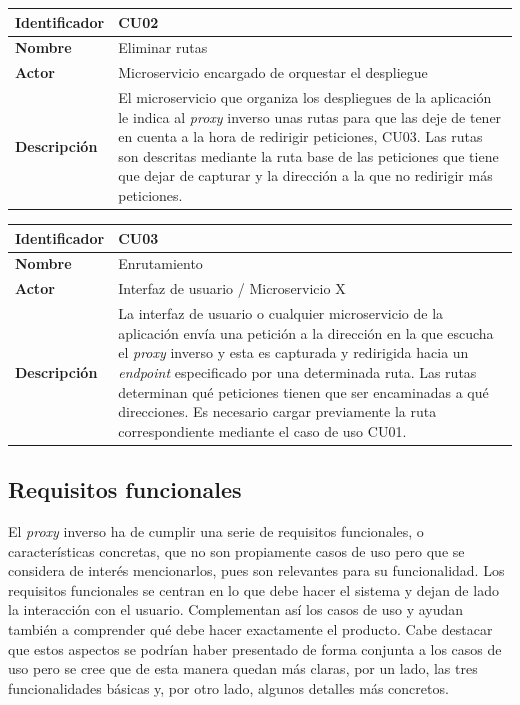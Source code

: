 \documentclass[11pt,spanish,listoffigures]{tfgetsinf}
\begin{document}
\begin{center} \begin{tabular}{| l | p{11.3cm} |}
\hline
\textbf{Identificador} & CU02
\\ \hline
\textbf{Nombre} & Eliminar rutas
\\ \hline
\textbf{Actor} & Microservicio encargado de orquestar el despliegue
\\ \hline
\textbf{Descripción} & El microservicio que organiza los despliegues de la aplicación le indica al \emph{proxy} inverso unas rutas para que las deje de tener en cuenta a la hora de redirigir peticiones, CU03. Las rutas son descritas mediante la ruta base de las peticiones que tiene que dejar de capturar y la dirección a la que no redirigir más peticiones.
\\ \hline \end{tabular} \end{center}

\begin{center} \begin{tabular}{| l | p{11.3cm} |}
\hline
\textbf{Identificador} & CU03
\\ \hline
\textbf{Nombre} & Enrutamiento
\\ \hline
\textbf{Actor} & Interfaz de usuario / Microservicio X
\\ \hline
\textbf{Descripción} & La interfaz de usuario o cualquier microservicio de la aplicación envía una petición a la dirección en la que escucha el \emph{proxy} inverso y esta es capturada y redirigida hacia un \emph{endpoint} especificado por una determinada ruta. Las rutas determinan qué peticiones tienen que ser encaminadas a qué direcciones. Es necesario cargar previamente la ruta correspondiente mediante el caso de uso CU01.
\\ \hline \end{tabular} \end{center}


		\subsection{Requisitos funcionales} \label{requisitosFuncionales}

El \emph{proxy} inverso ha de cumplir una serie de requisitos funcionales, o características concretas, que no son propiamente casos de uso pero que se considera de interés mencionarlos, pues son relevantes para su funcionalidad. Los requisitos funcionales se centran en lo que debe hacer el sistema y dejan de lado la interacción con el usuario. Complementan así los casos de uso y ayudan también a comprender qué debe hacer exactamente el producto. Cabe destacar que estos aspectos se podrían haber presentado de forma conjunta a los casos de uso pero se cree que de esta manera quedan más claras, por un lado, las tres funcionalidades básicas y, por otro lado, algunos detalles más concretos.
\end{document}
